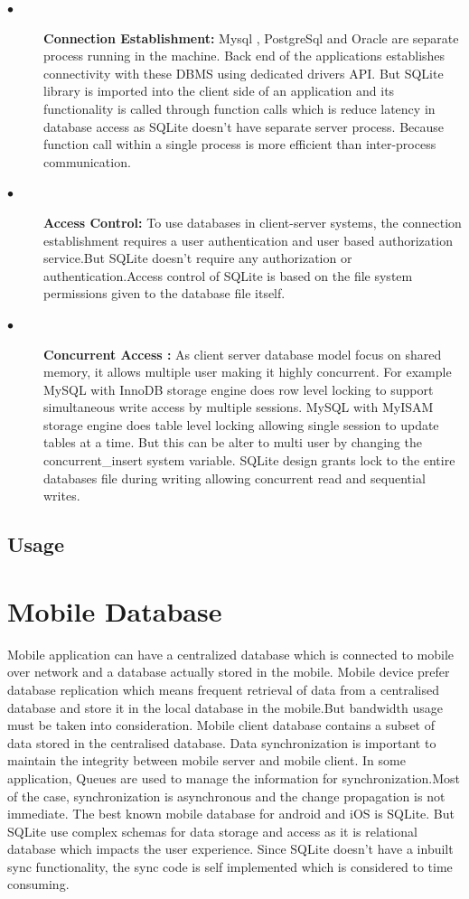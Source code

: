                   
\begin{description}
  \item[$\bullet$] {\bfseries Connection Establishment:} Mysql , PostgreSql and Oracle are separate process running in the machine. Back end of the applications establishes connectivity with these DBMS using dedicated drivers API. But SQLite library is imported into the client side of an application and its functionality is called through function calls which is reduce latency in database access as SQLite doesn't have separate server process. Because function call within a single process is more efficient than inter-process communication.  
  \item[$\bullet$] {\bfseries Access Control:} To use databases in client-server systems, the connection establishment requires a user authentication and user based authorization service.But SQLite doesn’t require any authorization or authentication.Access control of SQLite is based on the file system permissions given to the database file itself. 
  \item[$\bullet$] {\bfseries Concurrent Access :} As client server database model focus on shared memory, it allows multiple user making it highly concurrent. For example MySQL with InnoDB storage engine does row level locking to support simultaneous write access by multiple sessions. MySQL with MyISAM storage engine does table level locking allowing single session to update tables at a time. But this can be alter to multi user by changing the concurrent\_insert system variable. SQLite design grants lock to the entire databases file during writing allowing concurrent read and sequential writes.  
\end{description}  
                 
\subsection{Usage}

\section{Mobile Database}

			Mobile application can have a centralized database which is connected to mobile over network and a database actually stored in the  mobile. Mobile device prefer database replication which means frequent retrieval of data from a centralised database and store it in the local database in the mobile.But bandwidth usage must be taken into consideration. Mobile client database contains a subset of data stored in the centralised database. Data synchronization is important to maintain the integrity between mobile server and mobile client. In some application, Queues are used to manage the information for synchronization.Most of the case, synchronization is asynchronous and the change propagation is not immediate. The best known mobile database for android and iOS is SQLite. But SQLite use complex schemas for data storage and access as it is relational database which impacts the user experience. Since SQLite doesn't have a inbuilt sync functionality, the sync code is self implemented which is considered to time consuming.   
			

